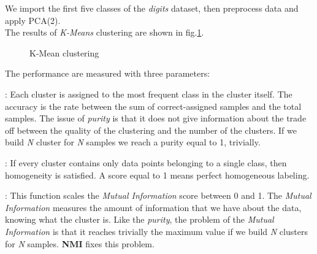 \documentclass[10pt,a4paper]{article}
\begin{document}
We import the first five classes of the \emph{digits} dataset, then preprocess data and apply PCA(2). \\

The results of \emph{K-Means} clustering are shown in fig.\ref{K_mean}. \\

\begin{figure}
\centering
{}\qquad\qquad
{}
\qquad\qquad
{}
\qquad\qquad
{}
\qquad\qquad
{}
\caption{K-Mean clustering\label{K_mean}}
\end{figure} 

The performance are measured with three parameters:
\begin{description}[leftmargin=3\parindent]
	\item[Purity]: Each cluster is assigned to the most frequent class in the cluster itself. The accuracy is the rate between the sum of correct-assigned samples and the total samples.
	The issue of \emph{purity} is that it does not give information about the trade off between the quality of the clustering and the number of the clusters. If we build \emph{N} cluster for \emph{N} samples we reach a purity equal to 1, trivially. 
	\item[Homogeneity]: If every cluster contains only data points belonging to a single class, then homogeneity is satisfied. A score equal to 1 means perfect homogeneous labeling.
	\item[Normalized Mutual Information]: This function scales the \emph{Mutual Information} score between 0 and 1. The \emph{Mutual Information} measures the amount of information that we have about the data, knowing what the cluster is. Like the \emph{purity}, the problem of the \emph{Mutual Information} is that it reaches trivially the maximum value if we build \emph{N} clusters for \emph{N} samples. \textbf{NMI} fixes this problem. 
\end{description}
\end{document}
